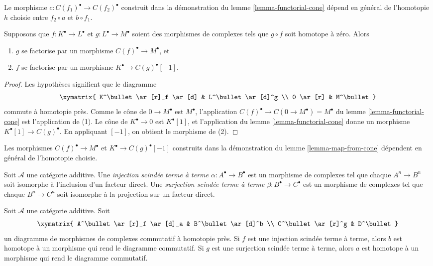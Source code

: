 \noindent
Le morphisme $c : C(f_1)^\bullet \to C(f_2)^\bullet$ construit dans la
démonstration du lemme \ref{lemma-functorial-cone} dépend en général de
l'homotopie $h$ choisie entre $f_2 \circ a$ et $b \circ f_1$.

\begin{lemma}
\label{lemma-map-from-cone}
Supposons que $f: K^\bullet \to L^\bullet$ et $g : L^\bullet \to M^\bullet$
soient des morphismes de complexes tels que $g \circ f$ soit homotope à zéro.
Alors
\begin{enumerate}
\item $g$ se factorise par un morphisme $C(f)^\bullet \to M^\bullet$, et
\item $f$ se factorise par un morphisme $K^\bullet \to C(g)^\bullet[-1]$.
\end{enumerate}
\end{lemma}

\begin{proof}
Les hypothèses signifient que le diagramme
$$
\xymatrix{
K^\bullet \ar[r]_f \ar[d] & L^\bullet \ar[d]^g \\
0 \ar[r] & M^\bullet
}
$$
commute à homotopie près.
Comme le cône de $0 \to M^\bullet$ est $M^\bullet$, l'application
$C(f)^\bullet \to C(0 \to M^\bullet) = M^\bullet$ du
lemme \ref{lemma-functorial-cone} est l'application de (1).
Le cône de $K^\bullet \to 0$ est $K^\bullet[1]$, et l'application du
lemme \ref{lemma-functorial-cone} donne un morphisme
$K^\bullet[1] \to C(g)^\bullet$. En appliquant $[-1]$, on obtient le morphisme
de (2).
\end{proof}

\noindent
Les morphismes $C(f)^\bullet \to M^\bullet$ et
$K^\bullet \to C(g)^\bullet[-1]$ construits dans la démonstration du
lemme \ref{lemma-map-from-cone} dépendent en général de l'homotopie choisie.

\begin{definition}
\label{definition-termwise-split-map}
Soit $\mathcal{A}$ une catégorie additive.
Une {\it injection scindée terme à terme
$\alpha : A^\bullet \to B^\bullet$} est un morphisme de complexes tel que
chaque $A^n \to B^n$ soit isomorphe à l'inclusion d'un facteur direct.
Une {\it surjection scindée terme à terme
$\beta : B^\bullet \to C^\bullet$} est un morphisme de complexes tel que chaque
$B^n \to C^n$ soit isomorphe à la projection sur un facteur direct.
\end{definition}

\begin{lemma}
\label{lemma-make-commute-map}
Soit $\mathcal{A}$ une catégorie additive.
Soit
$$
\xymatrix{
A^\bullet \ar[r]_f \ar[d]_a & B^\bullet \ar[d]^b \\
C^\bullet \ar[r]^g & D^\bullet
}
$$
un diagramme de morphismes de complexes commutatif à homotopie près.
Si $f$ est une injection scindée terme à terme, alors $b$ est homotope à un
morphisme qui rend le diagramme commutatif.
Si $g$ est une surjection scindée terme à terme, alors $a$ est homotope à un
morphisme qui rend le diagramme commutatif.
\end{lemma}

